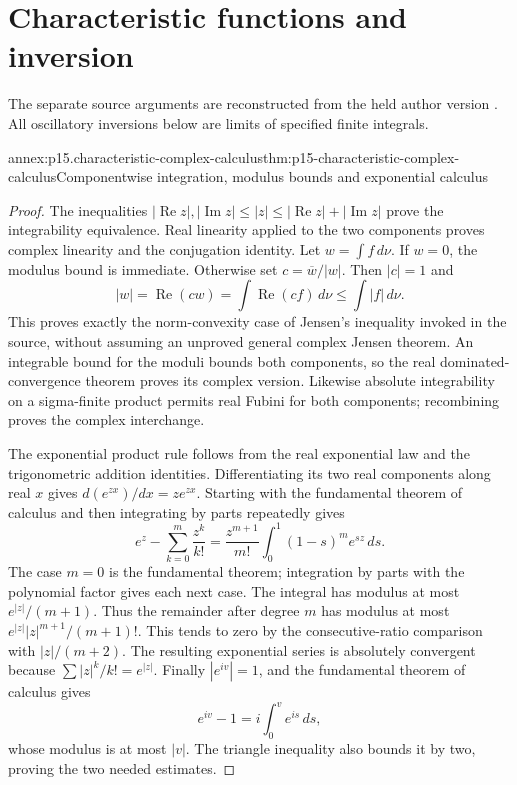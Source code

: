 \section{Characteristic functions and inversion}
\label{sec:annex-p15-characteristic-functions-and-inversion}

The separate source arguments are reconstructed from the held
author version \cite[pp.~125--136]{DurrettPTEAuthor2019}.
All oscillatory inversions below are limits of specified finite
integrals.

\begin{annexitem}{annex:p15.characteristic-complex-calculus}{thm:p15-characteristic-complex-calculus}{Componentwise integration, modulus bounds and exponential calculus}
\begin{proof}
The inequalities
\(|\operatorname{Re}z|,|\operatorname{Im}z|\leq|z|
\leq|\operatorname{Re}z|+|\operatorname{Im}z|\)
prove the integrability equivalence. Real linearity applied
to the two components proves complex linearity and the
conjugation identity.
Let \(w=\int f\,d\nu\). If \(w=0\), the modulus bound
is immediate. Otherwise set \(c=\overline w/|w|\).
Then \(|c|=1\) and
\[
 |w|=\operatorname{Re}(cw)
      =\int\operatorname{Re}(cf)\,d\nu
      \leq\int|f|\,d\nu.
\]
This proves exactly the norm-convexity case of Jensen's
inequality invoked in the source, without assuming an
unproved general complex Jensen theorem.
An integrable bound for the moduli bounds both components,
so the real dominated-convergence theorem proves its
complex version. Likewise absolute integrability on a
sigma-finite product permits real Fubini for both components;
recombining proves the complex interchange.

The exponential product rule follows from the real
exponential law and the trigonometric addition identities.
Differentiating its two real components along real \(x\)
gives \(d(e^{zx})/dx=ze^{zx}\).
Starting with the fundamental theorem of calculus and then
integrating by parts repeatedly gives
\[
 e^z-\sum_{k=0}^m\frac{z^k}{k!}
       =\frac{z^{m+1}}{m!}\int_0^1(1-s)^m e^{sz}\,ds.
\]
The case \(m=0\) is the fundamental theorem; integration
by parts with the polynomial factor gives each next case.
The integral has modulus at most \(e^{|z|}/(m+1)\).
Thus the remainder after degree \(m\) has modulus at most
\(e^{|z|}|z|^{m+1}/(m+1)!\).
This tends to zero by the consecutive-ratio comparison
with \(|z|/(m+2)\). The resulting exponential series is
absolutely convergent because
\(\sum |z|^k/k!=e^{|z|}\).
Finally \(|e^{iv}|=1\), and the fundamental theorem of
calculus gives
\[
 e^{iv}-1=i\int_0^v e^{is}\,ds,
\]
whose modulus is at most \(|v|\). The triangle inequality
also bounds it by two, proving the two needed estimates.
\end{proof}
\end{annexitem}

